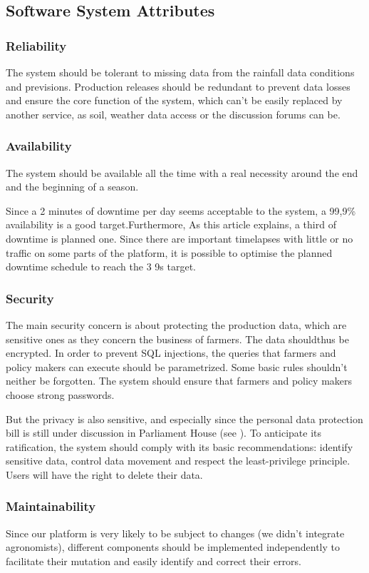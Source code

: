 \subsection{Software System Attributes}
\subsubsection{Reliability}
The system should be tolerant to missing data from the rainfall data conditions and previsions. Production releases should be redundant to prevent data losses and ensure the core function of the system, which can't be easily replaced by another service, as soil, weather data access or the discussion forums can be.
\subsubsection{Availability}
The system should be available all the time with a real necessity around the end and the beginning of a season.

Since a 2 minutes of downtime per day seems acceptable to the system, a 99,9\% availability is a good target.Furthermore, As this article \cite{downtime} explains, a third of downtime is planned one. Since there are important timelapses with little or no traffic on some parts of the platform, it is possible to optimise the planned downtime schedule to reach the 3 9s target.
\subsubsection{Security}
The main security concern is about protecting the production data, which are sensitive ones as they concern the business of farmers. The data shouldthus be encrypted. In order to prevent SQL injections, the queries that farmers and policy makers can execute should be parametrized. Some basic rules shouldn't neither be forgotten. The system should ensure that farmers and policy makers choose strong passwords.  

But the privacy is also sensitive, and especially since the personal data protection bill is still under discussion in Parliament House (see \cite{pdp}). To anticipate its ratification, the system should comply with its basic recommendations: identify sensitive data, control data movement and respect the least-privilege principle. Users will have the right to delete their data. 

\subsubsection{Maintainability}
Since our platform is very likely to be subject to changes (we didn't integrate agronomists), different components should be implemented independently to facilitate their mutation and easily identify and correct their errors.
